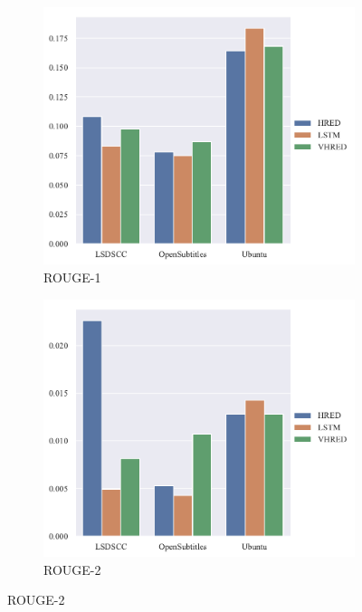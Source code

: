 \begin{figure}[H]
    \begin{subfigure}{0.5\linewidth}
        \centering
        \includegraphics[width=\linewidth]{figure/barplot/rouge_1/plot.pdf}
        \caption{ROUGE-1}
    \end{subfigure}%
    \begin{subfigure}{0.5\linewidth}
        \centering
        \includegraphics[width=\linewidth]{figure/barplot/rouge_2/plot.pdf}
        \caption{ROUGE-2}
    \end{subfigure}

\end{figure}
